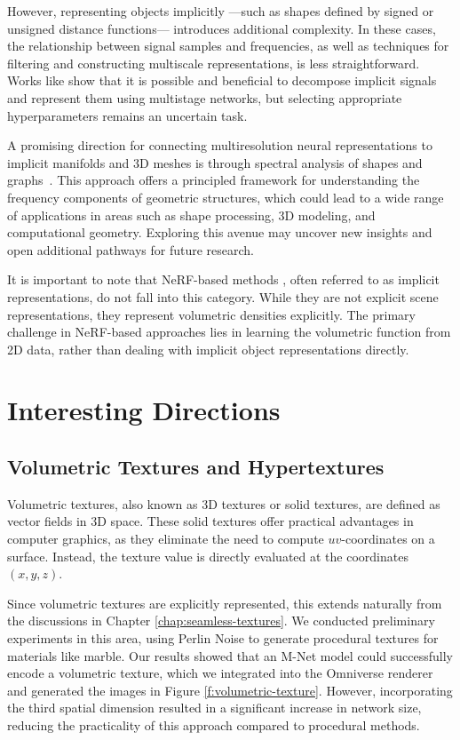 However, representing objects implicitly —such as shapes defined by signed or unsigned distance functions— introduces additional complexity. In these cases, the relationship between signal samples and frequencies, as well as techniques for filtering and constructing multiscale representations, is less straightforward. Works like \citet{silva2022mipplicits} show that it is possible and beneficial to decompose implicit signals and represent them using multistage networks, but selecting appropriate hyperparameters remains an uncertain task.

A promising direction for connecting multiresolution neural representations to implicit manifolds and 3D meshes is through spectral analysis of shapes and graphs~\citep{henrot2017shape, hua2019spectral}. This approach offers a principled framework for understanding the frequency components of geometric structures, which could lead to a wide range of applications in areas such as shape processing, 3D modeling, and computational geometry. Exploring this avenue may uncover new insights and open additional pathways for future research.

It is important to note that NeRF-based methods \citep{2020nerf}, often referred to as implicit representations, do not fall into this category. While they are not explicit scene representations, they represent volumetric densities explicitly. The primary challenge in NeRF-based approaches lies in learning the volumetric function from 2D data, rather than dealing with implicit object representations directly.


\section{Interesting Directions}

\subsection{Volumetric Textures and Hypertextures}
\label{sec:3Dtextures}

Volumetric textures, also known as 3D textures or solid textures, are defined as vector fields in 3D space. These solid textures offer practical advantages in computer graphics, as they eliminate the need to compute $uv$-coordinates on a surface. Instead, the texture value is directly evaluated at the coordinates $(x, y, z)$.

Since volumetric textures are explicitly represented, this extends naturally from the discussions in Chapter \ref{chap:seamless-textures}. We conducted preliminary experiments in this area, using Perlin Noise to generate procedural textures for materials like marble. Our results showed that an M-Net model could successfully encode a volumetric texture, which we integrated into the Omniverse renderer and generated the images in Figure \ref{f:volumetric-texture}. However, incorporating the third spatial dimension resulted in a significant increase in network size, reducing the practicality of this approach compared to procedural methods.

